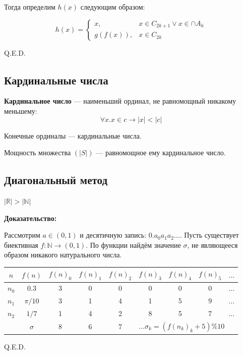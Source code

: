 Тогда определим $h(x)$ следующим образом:

$$h(x) = \left\{\begin{array}{ll} x, & x \in C_{2k+1} \vee x \in \cap A_k\\
                g(f(x)), & x \in C_{2k}\end{array}\right.$$

\hfill Q.E.D.

\subsection{Кардинальные числа}

 \textbf{Кардинальное число} --- наименьший ординал, не равномощный никакому меньшему:
$$\forall x.x \in c \rightarrow |x| < |c|$$

 Конечные ординалы --- кардинальные числа.

 Мощность множества $(|S|)$ --- равномощное ему кардинальное число.

\subsection{Диагональный метод}

 $|\mathbb{R}| > |\mathbb{N}|$

\textbf{Доказательство:}

Рассмотрим $a \in (0,1)$ и десятичную запись: $0.a_0a_1a_2\dots$.
Пусть существует биективная $f: \mathbb{N}\rightarrow (0,1)$.
По функции найдём значение $\sigma$, не являющееся образом никакого натурального числа.

\begin{center}
\begin{tabular}{cc|ccccccl}
 $n$ &  $f(n)$ & $f(n)_0$ & $f(n)_1$ & $f(n)_2$ & $f(n)_3$ & $f(n)_4$ & $f(n)_5$ & $\dots$ \\\hline
 $n_0$ &  0.3  &  \color{red}3    & 0    &  0  &  0  &  0  &  0 & $\dots$ \\
 $n_1$ & $\pi/10$ &  3  & \color{red}1    &  4  &  1  &  5  &  9 & $\dots$ \\
 $n_2$ & $1/7$   & 1 &   4    &  \color{red}2  &  8  &  5  &  7 & $\dots$ \\\hline
       & $\sigma$ & 8 &  6 &        7 &   \multicolumn{4}{l}{$\dots \sigma_k = (f(n_k)_k+5) \% 10$}
\end{tabular}
\end{center}

\hfill Q.E.D.

